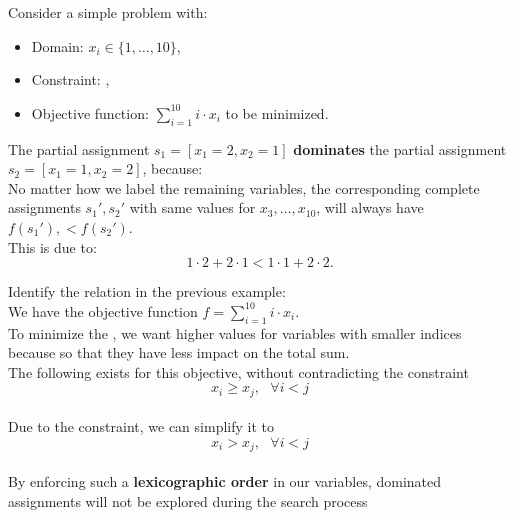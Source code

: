 \documentclass{cons-beamer}
\begin{document}
\begin{frame}
  \begin{example}[Dominance]
    Consider a simple problem with:
    \begin{itemize}
      \item Domain: \( x_i \in \{1, \ldots, 10\} \),
      \item Constraint: ,
      \item Objective function: \( \sum_{i=1}^{10} i \cdot x_i \) to be minimized.
    \end{itemize} 
    \vspace{5pt}
    
    The partial assignment \( s_1 = [x_1 = 2, x_2 = 1] \) \textbf{dominates} the partial assignment \( s_2 = [x_1 = 1, x_2 = 2] \), because:     \\[+5pt]
    No matter how we label the remaining variables, 
    the corresponding complete assignments \( s_1', s_2' \) with same values for \( x_3, \ldots, x_{10} \),
    will always have $f(s_1'), < f(s_2')$.
    \\[+5pt]
    This is due to:
    \[
    1 \cdot 2 + 2 \cdot 1 < 1 \cdot 1 + 2 \cdot 2.
    \]
  \end{example}
\end{frame}

\begin{frame}
  \begin{example}
    Identify the  relation in the previous example:
    \\[+5pt]
    We have the objective function $f = \sum_{i=1}^{10} i \cdot x_i$.
    \\[+5pt]
    To minimize the , we want higher values for variables with smaller indices because so that they have less impact on the total sum.
    \\[+5pt] 
    The following  exists for this objective, without contradicting the constraint
    $$x_i \geq x_j, \text{ } \forall i < j$$
    \\[+5pt]
    Due to the  constraint, we can simplify it to
    $$x_i > x_j, \text{ } \forall i < j$$
    \\[+5pt] 
    By enforcing such a \textbf{lexicographic order} in our variables, dominated assignments will not be explored during the search process
  \end{example}
\end{frame}
\end{document}
